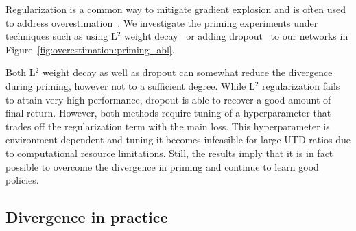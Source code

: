 Regularization is a common way to mitigate gradient explosion and is  often used to address overestimation~\parencite{farebrother2018generalization, chen2021randomized, liu2021regularization, hiraoka2022dropout, li2023efficient}. We investigate the priming experiments under techniques such as using L$^2$ weight decay~\parencite{krogh1991simple} or adding dropout~\parencite{srivastava14dropout} to our networks in Figure~\ref{fig:overestimation:priming_abl}.

Both L$^2$ weight decay as well as dropout can somewhat reduce the divergence during priming, however not to a sufficient degree.
While L$^2$ regularization fails to attain very high performance, dropout is able to recover a good amount of final return.
However, both methods require tuning of a hyperparameter that trades off the regularization term with the main loss.
This hyperparameter is environment-dependent and tuning it becomes infeasible for large UTD-ratios due to computational resource limitations. 
Still, the results imply that it is in fact possible to overcome the divergence in priming and continue to learn good policies.





\subsection{Divergence in practice} 
\label{sec:real}



